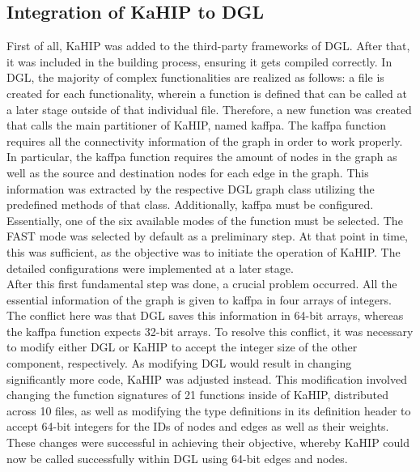 \documentclass[acmsmall,nonacm,screen,review]{acmart}
\begin{document}
\subsection{Integration of KaHIP to DGL}
First of all, KaHIP was added to the third-party frameworks of DGL. After that, it was included in the building process, ensuring it gets compiled correctly. In DGL, the majority of complex functionalities are realized as follows: a file is created for each functionality, wherein a function is defined that can be called at a later stage outside of that individual file. Therefore, a new function was created that calls the main partitioner of KaHIP, named kaffpa. The kaffpa function requires all the connectivity information of the graph in order to work properly. In particular, the kaffpa function requires the amount of nodes in the graph as well as the source and destination nodes for each edge in the graph. This information was extracted by the respective DGL graph class utilizing the predefined methods of that class. Additionally, kaffpa must be configured. Essentially, one of the six available modes of the function must be selected. The FAST mode was selected by default as a preliminary step. At that point in time, this was sufficient, as the objective was to initiate the operation of KaHIP. The detailed configurations were implemented at a later stage.\\
After this first fundamental step was done, a crucial problem occurred. All the essential information of the graph is given to kaffpa in four arrays of integers. The conflict here was that DGL saves this information in 64-bit arrays, whereas the kaffpa function expects 32-bit arrays. To resolve this conflict, it was necessary to modify either DGL or KaHIP to accept the integer size of the other component, respectively. As modifying DGL would result in changing significantly more code, KaHIP was adjusted instead. This modification involved changing the function signatures of 21 functions inside of KaHIP, distributed across 10 files, as well as modifying the type definitions in its definition header to accept 64-bit integers for the IDs of nodes and edges as well as their weights. These changes were successful in achieving their objective, whereby KaHIP could now be called successfully within DGL using 64-bit edges and nodes. \\
\end{document}
